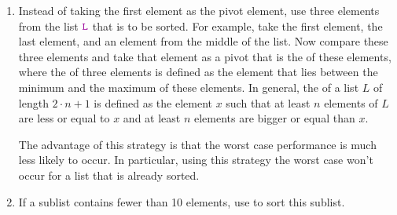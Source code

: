 \begin{enumerate}
\item Instead of taking the first element as the pivot element, use three elements from the list
      $\mytt{L}$ that is to be sorted.  For example, take the first element, the last element, and an
      element from the middle of the list.  Now compare these three elements and take that element as
      a pivot that is the  of these elements,  where the   of three
      elements is defined as the element that lies between the minimum and the maximum of these elements.
      In general, the  of a list $L$ of length $2 \cdot n +1$ is defined as the element $x$ such that at
      least $n$ elements of $L$ are less or equal to $x$ and at least $n$ elements are bigger or equal than $x$.
      
      The advantage of this strategy is that the worst case performance is much less likely to occur.  In
      particular,  using this strategy the worst case won't occur for a list that is already
      sorted.
\item If a sublist contains fewer than 10 elements, use  to sort this sublist.


\end{enumerate}
